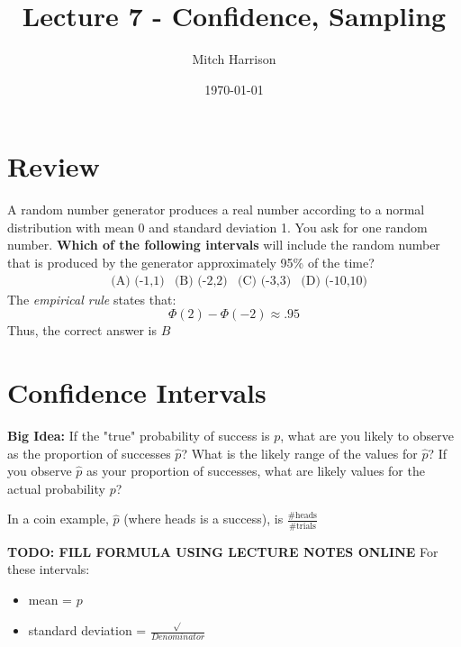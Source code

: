 \documentclass[titlepage, 12pt, leqno]{article}
\title{\Huge{Lecture 7 - Confidence, Sampling}}
\author{\large{Mitch Harrison}}
\date{\today}
\begin{document}
\setlength{\parskip}{1\baselineskip}
\setlength{\parindent}{15pt}
\maketitle
\tableofcontents
\newpage


\section{Review}

\begin{ex}
    A random number generator produces a real number according to a normal distribution with mean 0 and standard deviation 1. You ask for one random number. \textbf{Which of the following intervals} will include the random number that is produced by the generator approximately 95\% of the time?
\begin{align*}
    & \text{(A) (-1,1)} & \text{(B) (-2,2)} & \text{(C) (-3,3)} & \text{(D) (-10,10)}
\end{align*}
The \textit{empirical rule} states that:
\[
\Phi(2) - \Phi(-2) \approx .95
\]
Thus, the correct answer is $\boxed{B}$
\end{ex}

\pagebreak

\section{Confidence Intervals}

\textbf{Big Idea:} If the "true" probability of success is $p$, what are you likely to observe as the proportion of successes $\hat p$? What is the likely range of the values for $\hat p$? If you observe $\hat p$ as your proportion of successes, what are likely values for the actual probability $p$?

In a coin example, $\hat p$ (where heads is a success), is $\frac{ \text{\# heads}}{ \text{\# trials}} $

\textbf{TODO: FILL FORMULA USING LECTURE NOTES ONLINE} 
For these intervals:
\begin{itemize}
    \item mean = $p$
    \item standard deviation = $\frac{\sqrt{}}{Denominator}$
\end{itemize}
\end{document}
